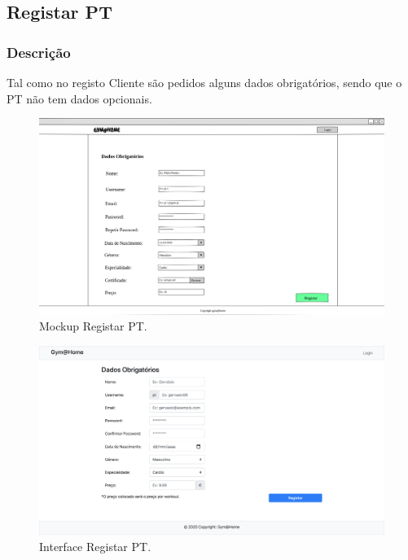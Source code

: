 \subsection{Registar PT}
\label{subsec:registarpt}

\subsubsection{Descrição}
\hspace{5mm} Tal como no registo Cliente são pedidos alguns dados obrigatórios, sendo que o PT não tem dados opcionais.

\begin{figure}[H]
    \centering
    \includegraphics[scale=0.25]{images/mockups/pt_registo.png}
    \caption{Mockup Registar PT.}
    \label{fig:mockupregistarpt}
\end{figure}

\begin{figure}[H]
    \centering
    \includegraphics[scale=0.25]{images/interfaces/pt_register.png}
    \caption{Interface Registar PT.}
    \label{fig:interfaceregistarpt}
\end{figure}

